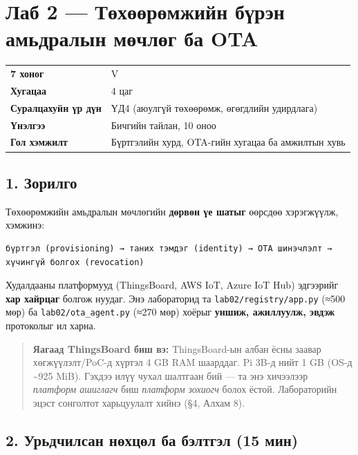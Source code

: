 \chapter{Лаб 2 — Төхөөрөмжийн бүрэн амьдралын мөчлөг ба OTA}

\begingroup\scriptsize\begin{longtable}[]{@{}ll@{}}
\toprule
\endhead
\textbf{7 хоног} & V\tabularnewline
\textbf{Хугацаа} & 4 цаг\tabularnewline
\textbf{Суралцахуйн үр дүн} & ҮД4 (аюулгүй төхөөрөмж, өгөгдлийн удирдлага)\tabularnewline
\textbf{Үнэлгээ} & Бичгийн тайлан, 10 оноо\tabularnewline
\textbf{Гол хэмжилт} & Бүртгэлийн хурд, OTA-гийн хугацаа ба амжилтын хувь\tabularnewline
\bottomrule
\end{longtable}\endgroup

\hypertarget{ux437ux43eux440ux438ux43bux433ux43e}{%
\section{1. Зорилго}\label{ux437ux43eux440ux438ux43bux433ux43e}}

Төхөөрөмжийн амьдралын мөчлөгийн \textbf{дөрвөн үе шатыг} өөрсдөө хэрэгжүүлж, хэмжинэ:

\begin{verbatim}
бүртгэл (provisioning) → таних тэмдэг (identity) → OTA шинэчлэлт → хүчингүй болгох (revocation)
\end{verbatim}

Худалдааны платформууд (ThingsBoard, AWS IoT, Azure IoT Hub) эдгээрийг \textbf{хар хайрцаг} болгож нуудаг. Энэ лабораторид та \texttt{lab02/\allowbreak{}registry/\allowbreak{}app.\allowbreak{}py} (≈500 мөр) ба \texttt{lab02/\allowbreak{}ota\_\allowbreak{}agent.\allowbreak{}py} (≈270 мөр) хоёрыг \textbf{уншиж, ажиллуулж, эвдэж} протоколыг ил харна.

\begin{quote}
\textbf{Яагаад ThingsBoard биш вэ:} ThingsBoard-ын албан ёсны заавар хөгжүүлэлт/PoC-д хүртэл 4 GB RAM шаарддаг. Pi 3B-д нийт 1 GB (OS-д \textasciitilde925 MiB). Гэхдээ илүү чухал шалтгаан бий --- та энэ хичээлээр \emph{платформ ашиглагч} биш \emph{платформ зохиогч} болох ёстой. Лабораторийн эцэст сонголтот харьцуулалт хийнэ (§4, Алхам 8).
\end{quote}

\hypertarget{ux443ux440ux44cux434ux447ux438ux43bux441ux430ux43d-ux43dux4e9ux445ux446ux4e9ux43b-ux431ux430-ux431ux44dux43bux442ux433ux44dux43b-15-ux43cux438ux43d}{%
\section{2. Урьдчилсан нөхцөл ба бэлтгэл (15 мин)}\label{ux443ux440ux44cux434ux447ux438ux43bux441ux430ux43d-ux43dux4e9ux445ux446ux4e9ux43b-ux431ux430-ux431ux44dux43bux442ux433ux44dux43b-15-ux43cux438ux43d}}

